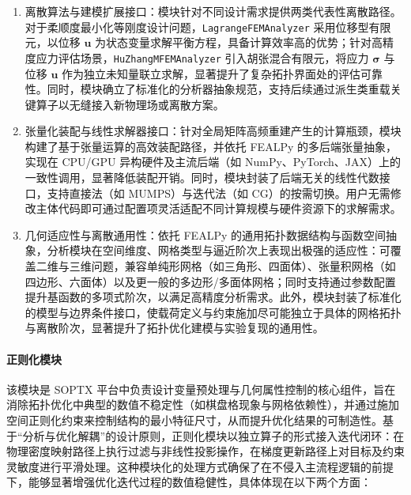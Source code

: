 \begin{enumerate}
	\item 离散算法与建模扩展接口：模块针对不同设计需求提供两类代表性离散路径。对于柔顺度最小化等刚度设计问题，\texttt{LagrangeFEMAnalyzer} 采用位移型有限元，以位移 $\boldsymbol{u}$ 为状态变量求解平衡方程，具备计算效率高的优势；针对高精度应力评估场景，\texttt{HuZhangMFEMAnalyzer} 引入胡张混合有限元，将应力 $\boldsymbol{\sigma}$ 与位移 $\boldsymbol{u}$ 作为独立未知量联立求解，显著提升了复杂拓扑界面处的评估可靠性。同时，模块确立了标准化的分析器抽象规范，支持后续通过派生类重载关键算子以无缝接入新物理场或离散方案。
	
	\item 张量化装配与线性求解器接口：针对全局矩阵高频重建产生的计算瓶颈，模块构建了基于张量运算的高效装配路径，并依托 FEALPy 的多后端张量抽象，实现在 CPU/GPU 异构硬件及主流后端（如 NumPy、PyTorch、JAX）上的一致性调用，显著降低装配开销。同时，模块封装了后端无关的线性代数接口，支持直接法（如 MUMPS）与迭代法（如 CG）的按需切换。用户无需修改主体代码即可通过配置项灵活适配不同计算规模与硬件资源下的求解需求。
	
	\item 几何适应性与离散通用性：依托 FEALPy 的通用拓扑数据结构与函数空间抽象，分析模块在空间维度、网格类型与逼近阶次上表现出极强的适应性：可覆盖二维与三维问题，兼容单纯形网格（如三角形、四面体）、张量积网格（如四边形、六面体）以及更一般的多边形/多面体网格；同时支持通过参数配置提升基函数的多项式阶次，以满足高精度分析需求。此外，模块封装了标准化的模型与边界条件接口，使载荷定义与约束施加尽可能独立于具体的网格拓扑与离散阶次，显著提升了拓扑优化建模与实验复现的通用性。
\end{enumerate}

\paragraph*{正则化模块}

该模块是 SOPTX 平台中负责设计变量预处理与几何属性控制的核心组件，旨在消除拓扑优化中典型的数值不稳定性（如棋盘格现象与网格依赖性），并通过施加空间正则化约束来控制结构的最小特征尺寸，从而提升优化结果的可制造性。基于“分析与优化解耦”的设计原则，正则化模块以独立算子的形式接入迭代闭环：在物理密度映射路径上执行过滤与非线性投影操作，在梯度更新路径上对目标及约束灵敏度进行平滑处理。这种模块化的处理方式确保了在不侵入主流程逻辑的前提下，能够显著增强优化迭代过程的数值稳健性，具体体现在以下两个方面：

